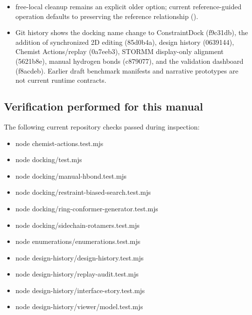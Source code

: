 \documentclass[11pt]{article}
\begin{document}
\begin{small}
\begin{itemize}[leftmargin=*]
\item free-local cleanup remains an explicit older option; current reference-guided operation defaults to preserving the reference relationship ().

\item Git history shows the docking name change to ConstraintDock (f9c31db), the addition of synchronized 2D editing (85d0b4a), design history (0639144), Chemist Actions/replay (0a7eeb3), STORMM display-only alignment (5621b8e), manual hydrogen bonds (c879077), and the validation dashboard (f8acdeb). Earlier draft benchmark manifests and narrative prototypes are not current runtime contracts.

\end{itemize}

\subsection{Verification performed for this manual}\label{appB:sec26}

The following current repository checks passed during inspection:

\begin{itemize}[leftmargin=*]

\item node chemist-actions.test.mjs

\item node docking/test.mjs

\item node docking/manual-hbond.test.mjs

\item node docking/restraint-biased-search.test.mjs

\item node docking/ring-conformer-generator.test.mjs

\item node docking/sidechain-rotamers.test.mjs

\item node enumerations/enumerations.test.mjs

\item node design-history/design-history.test.mjs

\item node design-history/replay-audit.test.mjs

\item node design-history/interface-story.test.mjs

\item node design-history/viewer/model.test.mjs


\end{itemize}
\end{small}
\end{document}
